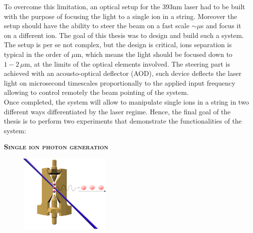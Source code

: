 \documentclass[english, a4paper, 12pt, twoside]{book}
\numberwithin{equation}{section} %
\begin{document}
To overcome this limitation, an optical setup for the 393nm laser had to be built with the purpose of focusing the light to a single ion in a string. Moreover the setup should have the ability to steer the beam on a fast scale $\sim\mu$s and focus it on a different ion. The goal of this thesis was to design and build such a system. The setup is per se not complex, but the design is critical, ions separation is typical in the order of $\mu$m, which means the light should be focused down to $1-2\,\mu$m, at the limits of the optical elements involved. The steering part is achieved with an acousto-optical deflector (AOD), such device deflects the laser light on microsecond timescales proportionally to the applied input frequency allowing to control remotely the beam pointing of the system.\\
Once completed, the system will allow to manipulate single ions in a string in two different ways differentiated by the laser regime. Hence, the final goal of the thesis is to perform two experiments that demonstrate the functionalities of the system:\vspace{-1em}\newline
\begin{center}{\large\textbf{\textsc{Single ion photon generation}}}\end{center}
\begin{figure}
  \begin{center}
    \includegraphics[width=0.4\textwidth]{photongeneration2}
  \end{center}
\end{figure}
\end{document}
